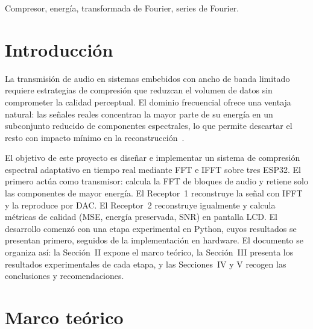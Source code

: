\documentclass[12pt, journal]{IEEEtran}
\begin{document}
\begin{IEEEkeywords}
Compresor, energía, transformada de Fourier, series de Fourier.
\end{IEEEkeywords}

\section{Introducción}

La transmisión de audio en sistemas embebidos con ancho de banda limitado
requiere estrategias de compresión que reduzcan el volumen de datos sin
comprometer la calidad perceptual. El dominio frecuencial ofrece una ventaja
natural: las señales reales concentran la mayor parte de su energía en un
subconjunto reducido de componentes espectrales, lo que permite descartar el
resto con impacto mínimo en la reconstrucción~\cite{proakis2007digital}.

El objetivo de este proyecto es diseñar e implementar un sistema de compresión
espectral adaptativo en tiempo real mediante FFT e IFFT sobre tres ESP32. El
primero actúa como transmisor: calcula la FFT de bloques de audio y retiene solo
las componentes de mayor energía. El Receptor~1 reconstruye la señal con IFFT y
la reproduce por DAC. El Receptor~2 reconstruye igualmente y calcula métricas
de calidad (MSE, energía preservada, SNR) en pantalla LCD. El desarrollo comenzó
con una etapa experimental en Python, cuyos resultados se presentan primero,
seguidos de la implementación en hardware. El documento se organiza así: la
Sección~II expone el marco teórico, la Sección~III presenta los resultados
experimentales de cada etapa, y las Secciones~IV y V recogen las conclusiones
y recomendaciones.

\section{Marco teórico}
\end{document}

